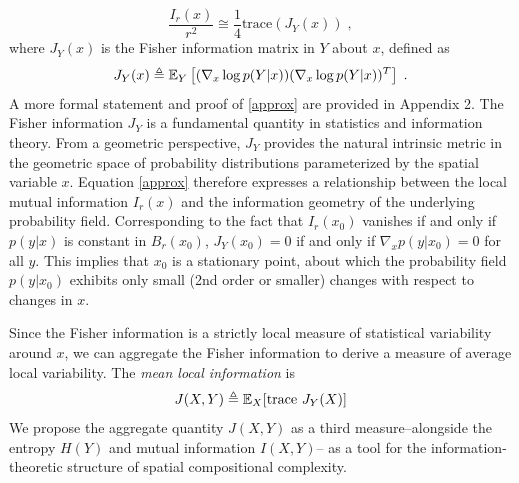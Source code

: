		\begin{equation}
			\frac{I_r(x)}{r^2} \cong \frac{1}{4} \text{trace} (J_Y(x))\;, \label{approx}
		\end{equation}
		where $J_Y(x)$ is the Fisher information matrix in $Y$ about $x$, defined as 
		\begin{equation}
			J_Y(x) \triangleq \mathbb{E}_Y\left[ (\nabla_x \log p(Y|x))(\nabla_x \log p(Y|x))^T \right]\;.
		\end{equation}
		A more formal statement and proof of \eqref{approx} are provided in Appendix 2. The Fisher information $J_Y$ is a fundamental quantity in statistics and information theory. From a geometric perspective, $J_Y$ provides the natural intrinsic metric in the geometric space of probability distributions parameterized by the spatial variable $x$. Equation \eqref{approx} therefore expresses a relationship between the local mutual information $I_r(x)$ and the information geometry of the underlying probability field. Corresponding to the fact that $I_r(x_0)$ vanishes if and only if $p(y|x)$ is constant in $B_r(x_0)$, $J_Y(x_0) = 0$ if and only if $\nabla_x p(y|x_0) = 0$ for all $y$. This implies that $x_0$ is a stationary point, about which the probability field $p(y|x_0)$ exhibits only small (2nd order or smaller) changes with respect to changes in $x$. 

		Since the Fisher information is a strictly local measure of statistical variability around $x$, we can aggregate the Fisher information to derive a measure of average local variability. The \emph{mean local information} is 
		\begin{equation}
		J(X,Y) \triangleq \mathbb{E}_X[\text{trace }J_Y(X)]
		\end{equation} 
		We propose the aggregate quantity $J(X,Y)$ as a third  measure--alongside the entropy $H(Y)$ and mutual information $I(X,Y)$-- as a tool for the information-theoretic structure of spatial compositional complexity. 
